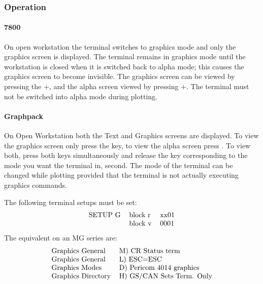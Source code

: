\subsubsection{Operation}
\paragraph{7800}
On open workstation the terminal switches to graphics mode and only the graphics
screen is displayed.
The terminal remains in graphics mode until the workstation is closed when it is
switched back to alpha mode; this causes the graphics screen to become
invisible.
The graphics screen can be viewed by pressing the +,
and the alpha screen viewed by pressing +.
The terminal must not be switched into alpha mode during plotting.
\paragraph{Graphpack}
On Open Workstation both the Text and Graphics screens are displayed.
To view the graphics screen only press the  key, to view 
the alpha screen press .
To view both, press both keys simultaneously and release the key corresponding
to the mode you want the terminal in, second.
The mode of the terminal can be changed while plotting provided that the
terminal is not actually executing graphics commands.

The following terminal setups must be set:
\[\begin{tabular}{lll}
SETUP G &block r &xx01\\
        &block v &0001\\
\end{tabular}\]
The equivalent on an MG series are:
\[\begin{tabular}{ll}
Graphics General   &M) CR Status term\\
Graphics General   &L) ESC=ESC\\
Graphics Modes     &D) Pericom 4014 graphics\\
Graphics Directory &H) GS/CAN Sets Term. Only\\
\end{tabular}\]

